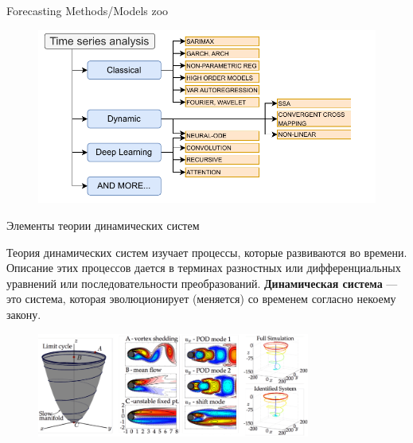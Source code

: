 
\usepackage{tikz}
\usepackage{amsmath}
\usepackage[english,russian]{babel}
\usepackage[labelformat=empty]{caption}

\usepackage{graphicx,animate}
\usepackage{animate}
\usepackage{caption}
\usepackage{subcaption}

\usetikzlibrary{arrows,shapes,positioning,shadows,trees}
\newcommand*{\defeq}{\stackrel{\text{def}}{=}}


\begin{frame}[plain]
\titlepage
\end{frame}
\begin{frame}{Forecasting Methods/Models zoo}
    \begin{figure}
        \includegraphics[width=1.1\linewidth, left]{./figs/init_diagram.pdf}
    \end{figure}
\end{frame}
\begin{frame}{Элементы теории динамических систем}

Теория динамических систем изучает процессы, которые развиваются во времени. 
Описание этих процессов дается в терминах разностных или дифференциальных
уравнений или последовательности преобразований.
\newline{}
\textbf{Динамическая система} --- это система, которая эволюционирует (меняется) со временем согласно некоему закону.
\begin{figure}
    \centering
    \includegraphics[width=0.8\textwidth]{lecture_4/figs/example-1.png}
\end{figure}

\end{frame}
